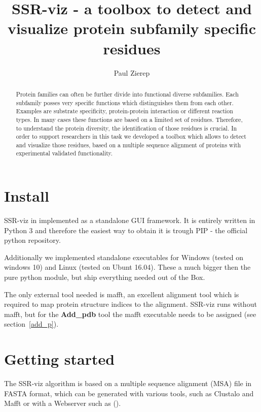 \documentclass[a4paper,10pt]{article}
\title{SSR-viz - a toolbox to detect and visualize protein
subfamily specific residues}
\author{Paul Zierep}
\begin{document}
\maketitle

\begin{abstract}

Protein families can often be further divide into 
functional diverse subfamilies. Each subfamily posses very specific functions
which distinguishes them from each other. Examples are substrate specificity,
protein-protein interaction or different reaction types. In many cases these functions are
based on a limited set of residues. Therefore, to understand the protein diversity,
the identification of those residues is crucial.
In order to support researchers in this task we developed a toolbox
which allows to detect and visualize those residues, based on a multiple sequence 
alignment of proteins with experimental validated functionality.

\end{abstract}

\pagebreak
\tableofcontents


\section{Install}


SSR-viz in implemented as a standalone GUI framework. It is entirely 
written in Python 3 and therefore the easiest way to obtain it is trough 
PIP - the official python repository. 

Additionally we implemented standalone 
executables for Windows (tested on windows 10) and Linux (tested on Ubunt 16.04).
These a much bigger then the pure python module, but ship everything needed out of
the Box. 

The only external tool needed is mafft, an excellent alignment tool which is 
required to map protein structure indices to the alignment. SSR-viz runs
without mafft, but for the \textbf{Add\_pdb} tool the mafft executable needs 
to be assigned (see section~\ref{add_p}).


\section{Getting started}

The SSR-viz algorithm is based on a multiple sequence alignment (MSA) file in 
FASTA format, which can be generated with various tools, such as Clustalo 
and Mafft or with a Webserver such as (). 
\end{document}
